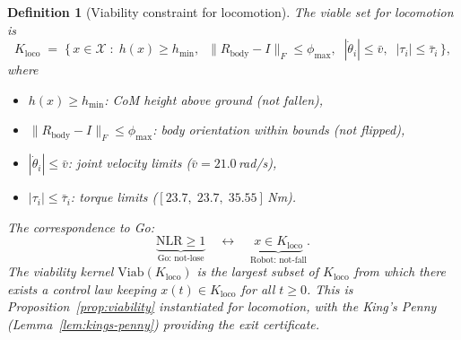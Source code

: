 \documentclass[11pt,a4paper]{article}
\newtheorem{definition}[theorem]{Definition}
\newcommand{\cX}{\mathcal{X}}
\newcommand{\norm}[1]{\lVert #1 \rVert}
\begin{document}
\begin{definition}[Viability constraint for locomotion]
\label{def:viability-locomotion}
The \emph{viable set} for locomotion is
\begin{equation}\label{eq:viable-loco}
  K_{\mathrm{loco}}
  \;=\;
  \bigl\{\,
    x \in \cX \;:\;
    h(x) \geq h_{\min},\;\;
    \norm{R_{\mathrm{body}} - I}_F \leq \phi_{\max},\;\;
    |\dot{\theta}_i| \leq \bar{v},\;\;
    |\tau_i| \leq \bar{\tau}_i
  \,\bigr\},
\end{equation}
where
\begin{itemize}[nosep]
\item $h(x) \geq h_{\min}$:
      CoM height above ground (not fallen),
\item $\norm{R_{\mathrm{body}} - I}_F \leq \phi_{\max}$:
      body orientation within bounds (not flipped),
\item $|\dot{\theta}_i| \leq \bar{v}$:
      joint velocity limits ($\bar{v} = 21.0$\,rad/s),
\item $|\tau_i| \leq \bar{\tau}_i$:
      torque limits ($[23.7,\; 23.7,\; 35.55]$\,Nm).
\end{itemize}
The correspondence to Go:
\[
  \underbrace{\mathrm{NLR} \geq 1}_{\text{Go: not-lose}}
  \quad\longleftrightarrow\quad
  \underbrace{x \in K_{\mathrm{loco}}}_{\text{Robot: not-fall}}.
\]
The \emph{viability kernel}
$\mathrm{Viab}(K_{\mathrm{loco}})$
is the largest subset of $K_{\mathrm{loco}}$
from which there exists a control law keeping
$x(t) \in K_{\mathrm{loco}}$ for all $t \geq 0$.
This is Proposition~\ref{prop:viability}
instantiated for locomotion,
with the King's Penny (Lemma~\ref{lem:kings-penny})
providing the exit certificate.
\end{definition}

\end{document}
